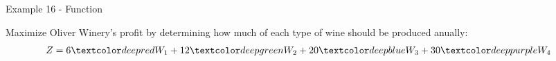 \begin{frame}{Example 16 - Function}

Maximize Oliver Winery's profit by determining how much of each
type of wine should be produced anually:
\begin{align*}
    Z &= 6\colora{W_1} + 12\colorb{W_2} + 20\colorc{W_3} + 30\colord{W_4}
\end{align*}

\end{frame}
